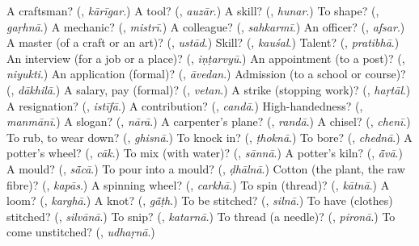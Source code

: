 \begin{tcolorbox}[breakable,colback=teal!4,colframe=teal!35!black,title={Before you move on}]
A craftsman? (\textbf{}, \emph{kārīgar}.) A tool? (\textbf{}, \emph{auzār}.) A skill? (\textbf{}, \emph{hunar}.) To shape? (\textbf{}, \emph{gaṛhnā}.) A mechanic? (\textbf{}, \emph{mistrī}.) A colleague? (\textbf{}, \emph{sahkarmī}.) An officer? (\textbf{}, \emph{afsar}.) A master (of a craft or an art)? (\textbf{}, \emph{ustād}.) Skill? (\textbf{}, \emph{kauśal}.) Talent? (\textbf{}, \emph{pratibhā}.) An interview (for a job or a place)? (\textbf{}, \emph{iṇṭarvyū}.) An appointment (to a post)? (\textbf{}, \emph{niyukti}.) An application (formal)? (\textbf{}, \emph{āvedan}.) Admission (to a school or course)? (\textbf{}, \emph{dākhilā}.) A salary, pay (formal)? (\textbf{}, \emph{vetan}.) A strike (stopping work)? (\textbf{}, \emph{haṛtāl}.) A resignation? (\textbf{}, \emph{istīfā}.) A contribution? (\textbf{}, \emph{candā}.) High-handedness? (\textbf{}, \emph{manmānī}.) A slogan? (\textbf{}, \emph{nārā}.) A carpenter's plane? (\textbf{}, \emph{randā}.) A chisel? (\textbf{}, \emph{chenī}.) To rub, to wear down? (\textbf{}, \emph{ghisnā}.) To knock in? (\textbf{}, \emph{ṭhoknā}.) To bore? (\textbf{}, \emph{chednā}.) A potter's wheel? (\textbf{}, \emph{cāk}.) To mix (with water)? (\textbf{}, \emph{sānnā}.) A potter's kiln? (\textbf{}, \emph{ā̃vā}.) A mould? (\textbf{}, \emph{sā̃cā}.) To pour into a mould? (\textbf{}, \emph{ḍhālnā}.) Cotton (the plant, the raw fibre)? (\textbf{}, \emph{kapās}.) A spinning wheel? (\textbf{}, \emph{carkhā}.) To spin (thread)? (\textbf{}, \emph{kātnā}.) A loom? (\textbf{}, \emph{karghā}.) A knot? (\textbf{}, \emph{gā̃ṭh}.) To be stitched? (\textbf{}, \emph{silnā}.) To have (clothes) stitched? (\textbf{}, \emph{silvānā}.) To snip? (\textbf{}, \emph{katarnā}.) To thread (a needle)? (\textbf{}, \emph{pironā}.) To come unstitched? (\textbf{}, \emph{udhaṛnā}.)
\end{tcolorbox}
